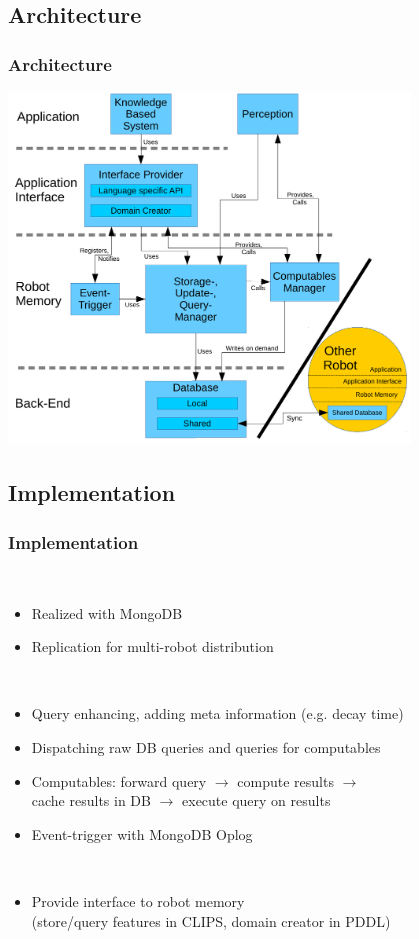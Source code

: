 \subsection{Architecture}
\begin{frame}
  \frametitle{Architecture}
  \center
  \includegraphics[width=0.8\textwidth]{../architecture.pdf}
\end{frame}

\subsection{Implementation}
\begin{frame}
  \frametitle{Implementation}
  \begin{description}[]
  \item[Back-End] \hfill \\
    \begin{itemize}
    \item Realized with MongoDB
    \item Replication for multi-robot distribution
    \end{itemize}
  \smallskip
  \item[Robot Memory] \hfill \\
    \begin{itemize}
    \item Query enhancing, adding meta information (e.g. decay time)
    \item Dispatching raw DB queries and queries for computables
    \item Computables: forward query $\rightarrow$ compute results $\rightarrow$ \\
          cache results in DB $\rightarrow$ execute query on results
    \item Event-trigger with MongoDB Oplog
    \end{itemize}
  \smallskip
  \item[Planner/Reasoner] \hfill \\
    \begin{itemize}
    \item Provide interface to robot memory\\
          (store/query features in CLIPS, domain creator in PDDL)
    \end{itemize}
  \end{description}  
\end{frame}

